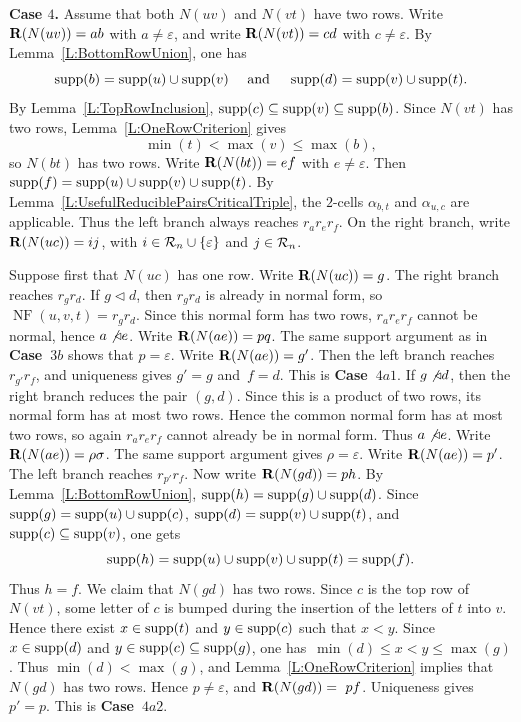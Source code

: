 \documentclass[a4paper, twoside, 11pt, english]{article}
\begin{document}
\medskip

\noindent
\textbf{Case $4$.}
Assume that both $N(uv)$ and $N(vt)$ have two rows. Write
$\mathbf{R}(N(uv))=ab$ with $a\neq\varepsilon$, and write $\mathbf{R}(N(vt))=cd$ with
$c\neq\varepsilon$. By Lemma~\ref{L:BottomRowUnion}, one has
\[
\operatorname{supp}(b)=\operatorname{supp}(u)\cup\operatorname{supp}(v) \quad  \text{ and }\quad \operatorname{supp}(d)=\operatorname{supp}(v)\cup\operatorname{supp}(t). 
\]
By Lemma~\ref{L:TopRowInclusion},
$\operatorname{supp}(c)\subseteq\operatorname{supp}(v)\subseteq\operatorname{supp}(b)$.
Since $N(vt)$ has two rows, Lemma~\ref{L:OneRowCriterion} gives
\[
\min(t)<\max(v)\le\max(b),
\]
 so $N(bt)$ has two rows. Write
$\mathbf{R}(N(bt))=ef$ with $e\neq\varepsilon$. Then
$\operatorname{supp}(f)=\operatorname{supp}(u)\cup\operatorname{supp}(v)\cup\operatorname{supp}(t)$.
By Lemma~\ref{L:UsefulReduciblePairsCriticalTriple}, the $2$-cells
$\alpha_{b,t}$ and $\alpha_{u,c}$ are applicable. Thus the left branch always
reaches $r_a r_e r_f$. On the right branch, write $\mathbf{R}(N(uc))=ij$, with
$i\in\mathcal{R}_n\cup\{\varepsilon\}$ and $j\in\mathcal{R}_n$.

Suppose first that $N(uc)$ has one row. Write $\mathbf{R}(N(uc))=g$. The right branch
reaches $r_g r_d$.
If $g\triangleleft d$, then $r_g r_d$ is already in normal form, so
$\operatorname{NF}(u,v,t)=r_g r_d$. Since this normal form has two rows,
$r_a r_e r_f$ cannot be normal, hence $a\not\triangleleft e$. Write
$\mathbf{R}(N(ae))=pq$. The same support argument as in \textbf{Case~$3b$} shows that
$p=\varepsilon$. Write $\mathbf{R}(N(ae))=g'$. Then the left branch reaches
$r_{g'}r_f$, and uniqueness gives $g'=g$ and~$f=d$. This is \textbf{Case~$4a1$}.
If $g\not\triangleleft d$, then the right branch reduces the pair $(g,d)$.
Since this is a product of two rows, its normal form has at most two rows.
Hence the common normal form has at most two rows, so again $r_a r_e r_f$
cannot already be in normal form. Thus $a\not\triangleleft e$. Write
$\mathbf{R}(N(ae))=\rho\sigma$. The same support argument gives $\rho=\varepsilon$.
Write $\mathbf{R}(N(ae))=p'$. The left branch reaches $r_{p'}r_f$.
Now write $\mathbf{R}(N(gd))=ph$. By Lemma~\ref{L:BottomRowUnion},
$\operatorname{supp}(h)=\operatorname{supp}(g)\cup\operatorname{supp}(d)$. Since
$\operatorname{supp}(g)=\operatorname{supp}(u)\cup\operatorname{supp}(c)$, $\operatorname{supp}(d)=\operatorname{supp}(v)\cup\operatorname{supp}(t)$, and
$\operatorname{supp}(c)\subseteq\operatorname{supp}(v)$, one gets
\[
\operatorname{supp}(h)=\operatorname{supp}(u)\cup\operatorname{supp}(v)\cup\operatorname{supp}(t)=\operatorname{supp}(f).
\]
Thus $h=f$.
We claim that $N(gd)$ has two rows. Since $c$ is the top row of $N(vt)$,
some letter of $c$ is bumped during the insertion of the letters of $t$ into
$v$. Hence there exist $x\in\operatorname{supp}(t)$ and $y\in\operatorname{supp}(c)$ such that $x<y$.
Since $x\in\operatorname{supp}(d)$ and $y\in\operatorname{supp}(c)\subseteq\operatorname{supp}(g)$, one has~$\min(d)\le x<y\le\max(g)$.
Thus $\min(d)<\max(g)$, and Lemma~\ref{L:OneRowCriterion} implies that
$N(gd)$ has two rows. Hence $p\neq\varepsilon$, and $\mathbf{R}(N(gd))=~pf$.
Uniqueness gives $p'=p$. This is \textbf{Case~$4a2$}.
\end{document}
